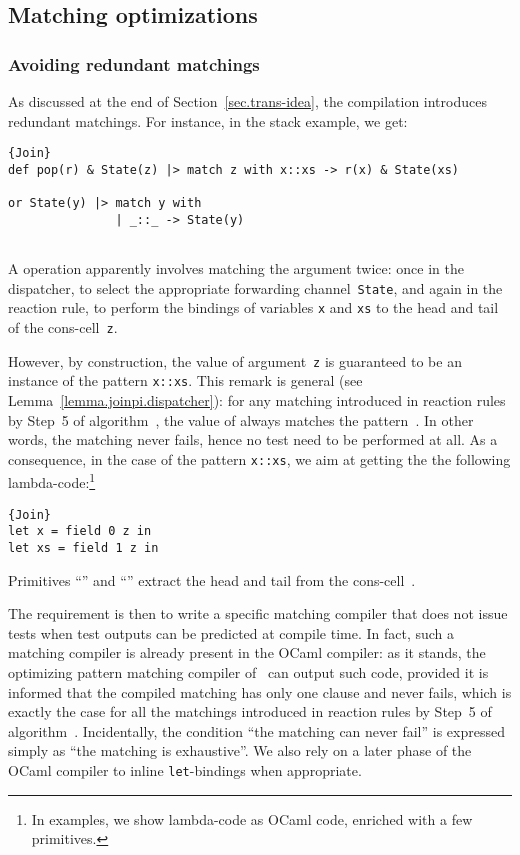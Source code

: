 \documentclass{LMCS}
\let \lst \lstinline
\newcommand{\ocaml}{\textrm{OCaml}\xspace}
\renewcommand{\_}{\mathord{\rule[-.25ex]{1ex}{.15ex}}}
\begin{document}
\subsection{Matching optimizations}
\label{subsec.optimization}

\subsubsection{Avoiding redundant matchings}
As discussed at the end of Section~\ref{sec.trans-idea},
the compilation introduces redundant matchings.
For instance, in the stack example, we get:
\begin{lstlisting}{Join}
def pop(r) & State(z) |> match z with x::xs -> r(x) & State(xs)
  
or State(y) |> match y with
               | _::_ -> State(y)
                         
\end{lstlisting}
A  operation apparently involves matching the 
argument twice: once in the dispatcher, to select the appropriate
forwarding channel~\lst|State|, and again
in the reaction rule, to perform the bindings of variables \lst|x| and
\lst|xs| to the head and tail of the cons-cell~\lst|z|.

However, by construction, the value of argument~\lst|z| is guaranteed
to be an instance of the pattern \lst|x::xs|. This remark is general
(see Lemma~\ref{lemma.joinpi.dispatcher}): for any matching
 introduced in reaction rules by Step~5 of
algorithm~, the value of  always matches the
pattern~.  In other words, the matching
 never fails, hence no test need to be
performed at all. As a consequence, in the case of the pattern
\lst|x::xs|, we aim at getting the the following
lambda-code:\footnote{In examples, we show lambda-code as \ocaml code,
enriched with a few primitives.}
\begin{lstlisting}{Join}
let x = field 0 z in 
let xs = field 1 z in

\end{lstlisting}
Primitives ``'' and ``'' extract the head and tail from the cons-cell~.

The requirement is then to write a specific matching compiler that
does not issue tests when test outputs can be predicted at compile
time. In fact, such a matching compiler is already present in the
\ocaml compiler: as it stands, the optimizing pattern matching
compiler of~\cite{LefessantMarangetPattern} can output such code,
provided it is informed that the compiled matching has only one clause
and never fails, which is exactly the case for all the matchings
 introduced in reaction rules by Step~5 of
algorithm~.
Incidentally, the condition ``the matching can never fail'' is
expressed simply as ``the matching is exhaustive''.
We also rely on a later phase of the \ocaml compiler
to inline \lst|let|-bindings when appropriate. 
\end{document}
